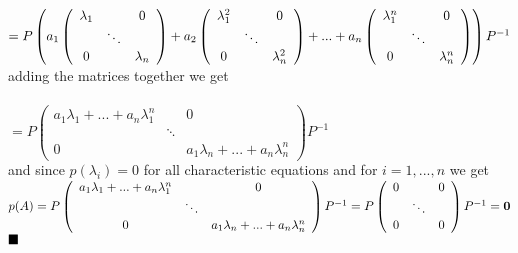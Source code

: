 \documentclass[letterpaper,12pt]{article}
\theoremstyle{definition}
\begin{document}
$
= P\left(a_1 
 \left(
    \begin{array}{ccccc}
\lambda_1 &     & 0 \\
          &\ddots             &   \\
   0     &      & \lambda_n
  \end{array}\right)
+ a_2
  \left(
    \begin{array}{ccccc}
\lambda_1^2 &     & 0  \\
          &\ddots             &   \\
    0     &      & \lambda_n^2
  \end{array}\right)
 +
  ...+a_n
  \left(
    \begin{array}{ccccc}
\lambda_1^n &     & 0  \\
          &\ddots             &   \\
   0    &      & \lambda_n^n
  \end{array}\right) \right)P^{-1}
\\$
adding the matrices together we get\\
\\
$= P\left( 
 \begin{array}{ccccc}
a_1\lambda_1 + ...+a_n\lambda_1^n &     & 0  \\
          &\ddots             &   \\
    0     &      & a_1\lambda_n + ...+a_n\lambda_n^n
  \end{array}
\right)P^{-1}
  $\\
 and since $p(\lambda_i) =  0$ for all characteristic equations  and for $i=1,...,n$ we get\\
 $ p(A)=  P\left( 
 \begin{array}{ccccc}
a_1\lambda_1 + ...+a_n\lambda_1^n &     & 0 \\
          &\ddots             &   \\
    0     &      & a_1\lambda_n + ...+a_n\lambda_n^n
  \end{array}
\right)P^{-1}\\
 =P\left( 
 \begin{array}{ccccc}
0 &     & 0  \\
          &\ddots             &   \\
    0     &      & 0
  \end{array}
\right)P^{-1}
= \bold 0$
  $ \hfill \blacksquare$\\
\end{document}
